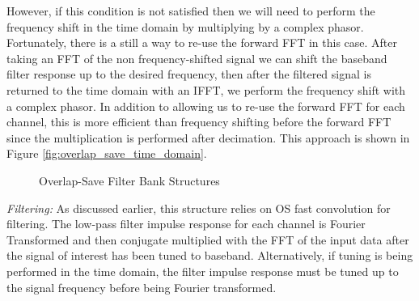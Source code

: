 \documentclass[12pt]{article}
\begin{document}
However, if this condition is not satisfied then we will need to perform the
frequency shift in the time domain by multiplying by a complex phasor.
Fortunately, there is a still a way to re-use the forward FFT in this case.
After taking an FFT of the non frequency-shifted signal we can shift the
baseband filter response up to the desired frequency, then after the filtered
signal is returned to the time domain with an IFFT, we perform the frequency
shift with a complex phasor.  In addition to allowing us to re-use the forward
FFT for each channel, this is more efficient than frequency shifting before the
forward FFT since the multiplication is performed after decimation. This
approach is shown in Figure \ref{fig:overlap_save_time_domain}.

\begin{figure}[bh!]
\centerline{
    \hfill
}
\caption{Overlap-Save Filter Bank Structures}
\label{fig:overlap_save_filter_banks}
\end{figure}

\emph{Filtering:} As discussed earlier, this structure relies on OS fast
convolution for filtering. The low-pass filter impulse response for each
channel is Fourier Transformed and then conjugate multiplied with the FFT of
the input data after the signal of interest has been tuned to baseband.
Alternatively, if tuning is being performed in the time domain, the filter
impulse response must be tuned up to the signal frequency before being Fourier
transformed.
\end{document}
